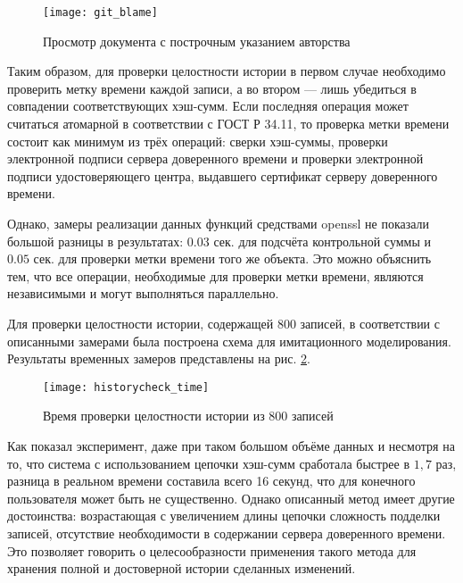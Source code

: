 \begin{figure}[h!]
  \centering
  \texttt{[image: git\_blame]}
  \caption{Просмотр документа с построчным указанием авторства}
  \label{img:git_blame}
\end{figure}

\vspace{\baselineskip}
Таким образом, для проверки целостности истории в первом случае необходимо проверить метку времени каждой записи, а во втором --- лишь убедиться в совпадении соответствующих хэш-сумм. Если последняя операция может считаться атомарной в соответствии с ГОСТ Р 34.11, то проверка метки времени состоит как минимум из трёх операций: сверки хэш-суммы, проверки электронной подписи сервера доверенного времени и проверки электронной подписи удостоверяющего центра, выдавшего сертификат серверу доверенного времени.

\vspace{\baselineskip}
Однако, замеры реализации данных функций средствами openssl не показали большой разницы в результатах: $0.03$ сек. для подсчёта контрольной суммы и $0.05$ сек. для проверки метки времени того же объекта. Это можно объяснить тем, что все операции, необходимые для проверки метки времени, являются независимыми и могут выполняться параллельно.

\vspace{\baselineskip}
Для проверки целостности истории, содержащей 800 записей, в соответствии с описанными замерами была построена схема для имитационного моделирования. Результаты временных замеров представлены на рис. \ref{img:historycheck_time}.

\begin{figure}[h!]
  \centering
  \texttt{[image: historycheck\_time]}
  \caption{Время проверки целостности истории из 800 записей}
  \label{img:historycheck_time}
\end{figure}

\vspace{\baselineskip}
Как показал эксперимент, даже при таком большом объёме данных и несмотря на то, что система с использованием цепочки хэш-сумм сработала быстрее в $1,7$ раз, разница в реальном времени составила всего 16 секунд, что для конечного пользователя может быть не существенно. Однако описанный метод имеет другие достоинства: возрастающая с увеличением длины цепочки сложность подделки записей, отсутствие необходимости в содержании сервера доверенного времени. Это позволяет говорить о целесообразности применения такого метода для хранения полной и достоверной истории сделанных изменений.